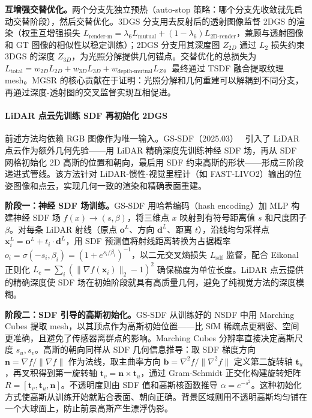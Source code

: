 \textbf{互增强交替优化。}两个分支先独立预热（auto-stop 策略：哪个分支先收敛就先启动交替阶段），然后交替优化。3DGS 分支用去反射后的透射图像监督 2DGS 的渲染（权重互增强损失 $L_{\text{render-m}} = \lambda_6 L_{\text{mutual}} + (1-\lambda_6) L_{\text{2D-render}}$，兼顾与透射图像和 GT 图像的相似性以稳定训练）；2DGS 分支用其深度图 $Z_{2D}$ 通过 $L_2$ 损失约束 3DGS 的深度 $Z_{3D}$，为光照分解提供几何锚点。交替优化的总损失为 $L_{\text{total}} = w_{2D} L_{2D} + w_{3D} L_{3D} + w_{\text{depth-mutual}} L_Z$。最终通过 TSDF 融合提取纹理 mesh。MGSR 的核心贡献在于证明：光照分解和几何重建可以解耦到不同分支，再通过深度-透射图的交叉监督实现互相促进。

\paragraph{LiDAR 点云先训练 SDF 再初始化 2DGS}

前述方法均依赖 RGB 图像作为唯一输入。GS-SDF（2025.03）~\cite{2503_10170} 引入了 LiDAR 点云作为额外几何先验——用 LiDAR 精确深度先训练神经 SDF 场，再从 SDF 网格初始化 2D 高斯的位置和朝向，最后用 SDF 约束高斯的形状——形成三阶段递进式管线。该方法针对 LiDAR-惯性-视觉里程计（如 FAST-LIVO2）输出的位姿图像和点云，实现几何一致的渲染和精确表面重建。

\textbf{阶段一：神经 SDF 场训练。}GS-SDF 用哈希编码（hash encoding）加 MLP 构建神经 SDF 场 $f(x) \to (s, \beta)$，将三维点 $x$ 映射到有符号距离值 $s$ 和尺度因子 $\beta$。对每条 LiDAR 射线（原点 $\mathbf{o}^L$、方向 $\mathbf{d}^L$、距离 $t$），沿线均匀采样点 $\mathbf{x}_i^L = \mathbf{o}^L + t_i \cdot \mathbf{d}^L$，用 SDF 预测值将射线距离转换为占据概率 $o_i = \sigma(-s_i, \beta_i) = (1 + e^{s_i/\beta_i})^{-1}$，以二元交叉熵损失 $L_{\text{sdf}}$ 监督，配合 Eikonal 正则化 $L_e = \sum_i (\|\nabla f(\mathbf{x}_i)\|_2 - 1)^2$ 确保梯度为单位长度。LiDAR 点云提供的精确深度使 SDF 场在初始阶段就具有高质量几何，避免了纯视觉方法的深度模糊。

\textbf{阶段二：SDF 引导的高斯初始化。}GS-SDF 从训练好的 NSDF 中用 Marching Cubes 提取 mesh，以其顶点作为高斯初始位置——比 SfM 稀疏点更稠密、空间更准确，且避免了传感器离群点的影响。Marching Cubes 分辨率直接决定高斯尺度 $s_u, s_v$。高斯的朝向同样从 SDF 几何信息推导：取 SDF 梯度方向 $\mathbf{n} = \nabla f / \|\nabla f\|$ 作为法线，取主曲率方向 $\mathbf{b} = \nabla^2 f / \|\nabla^2 f\|$ 定义第二旋转轴 $\mathbf{t}_u$，再叉积得到第一旋转轴 $\mathbf{t}_v = \mathbf{n} \times \mathbf{t}_u$，通过 Gram-Schmidt 正交化构建旋转矩阵 $R = [\mathbf{t}_v, \mathbf{t}_u, \mathbf{n}]$。不透明度则由 SDF 值和高斯核函数推导 $\alpha = e^{-s^2}$。这种初始化方式使高斯从训练开始就贴合表面、朝向正确。背景区域则用不透明高斯均匀铺在一个大球面上，防止前景高斯产生漂浮伪影。

